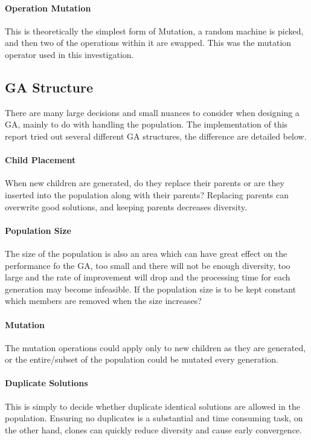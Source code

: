 \documentclass[14pt]{acmsiggraph}
\begin{document}
	\paragraph{Operation Mutation}
	This is theoretically the simplest form of Mutation, a random machine is picked, and then two of the operations within it are swapped. This was the mutation operator used in this investigation.
	
	\subsection{GA Structure}
	There are many large decisions and small nuances to consider when designing a GA, mainly to do with handling the population. The implementation of this report tried out several different GA structures, the difference are detailed below. 
	
	\paragraph{Child Placement}
	When new children are generated, do they replace their parents or are they inserted into the population along with their parents? Replacing parents can overwrite good solutions, and keeping parents decreases diversity.
	
	\paragraph{Population Size}
	The size of the population is also an area which can have great effect on the performance fo the GA, too small and there will not be enough diversity, too large and the rate of improvement will drop and the processing time for each generation may become infeasible. If the population size is to be kept constant which members are removed when the size increases?
	
	\paragraph{Mutation}
	The  mutation operations could apply only to new children as they are generated, or the entire/subset of the population could be mutated every generation.
	
	\paragraph{Duplicate Solutions}
	This is simply to decide whether duplicate identical solutions are allowed in the population. Ensuring no duplicates is a substantial and time consuming task, on the other hand, clones can quickly reduce diversity and cause early convergence.
	
\end{document}
